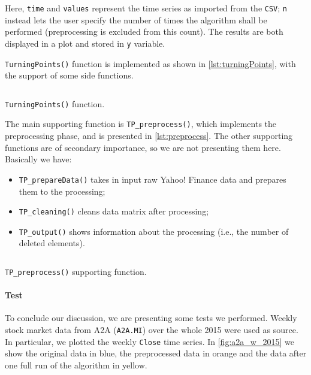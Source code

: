 \documentclass[a4paper]{article}
\newcommand{\csv}{\texttt{CSV}\xspace}
\begin{document}
Here, \texttt{time} and \texttt{values} represent the time series as imported from the \csv; \texttt{n} instead lets the user specify the number of times the algorithm shall be performed (preprocessing is excluded from this count). The results are both displayed in a plot and stored in \texttt{y} variable.

\texttt{TurningPoints()} function is implemented as shown in \cref{lst:turningPoints}, with the support of some side functions.

\clearpage %

\begin{listing}%
 
\inputminted[firstline = 1, lastline = 50]{matlab}{../code/TurningPoints.m}

\caption{\texttt{TurningPoints()} function.}\label{lst:turningPoints}

\end{listing}

\clearpage %

The main supporting function is \texttt{TP\_preprocess()}, which implements the preprocessing phase, and is presented in \cref{lst:preprocess}. The other supporting functions are of secondary importance, so we are not presenting them here. Basically we have: \begin{itemize}
	\item \texttt{TP\_prepareData()} takes in input raw Yahoo! Finance data and prepares them to the processing;
	\item \texttt{TP\_cleaning()} cleans data matrix after processing;
	\item \texttt{TP\_output()} shows information about the processing (i.e., the number of deleted elements).
\end{itemize} 

\begin{listing}%
 
\inputminted[firstline = 53, lastline = 78]{matlab}{../code/TurningPoints.m}

\caption{\texttt{TP\_preprocess()} supporting function.}\label{lst:preprocess}

\end{listing}


\paragraph{Test} To conclude our discussion, we are presenting some tests we performed. Weekly stock market data from A2A (\texttt{A2A.MI}) over the whole 2015 were used as source. In particular, we plotted the weekly \texttt{Close} time series. In \cref{fig:a2a_w_2015} we show the original data in blue, the preprocessed data in orange and the data after one full run of the algorithm in yellow. 
\end{document}
